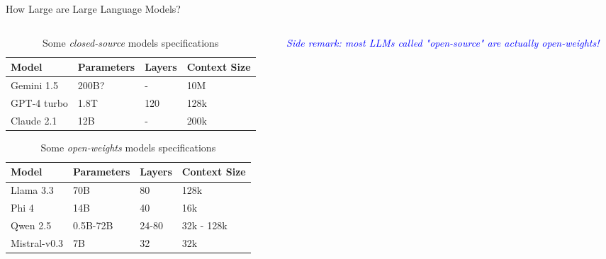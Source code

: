 \documentclass[11pt,aspectratio=169]{beamer}
\begin{document}
\begin{frame}{How Large are Large Language Models?}
    \begin{columns}
        \begin{column}{0.6\linewidth}
            \vspace{-0.1cm}
            \begin{table}[]
                \begin{tabular}{@{}llll@{}}
                    \toprule
                    Model       & Parameters & Layers & Context Size  \\ \midrule
                    Gemini 1.5  & 200B?      & -      & 10M  \\
                    GPT-4 turbo & 1.8T       & 120    & 128k            \\
                    Claude 2.1  & 12B        & -      & 200k            \\ \bottomrule
                \end{tabular}
                \caption{\centering Some \textsl{closed-source} models specifications}
            \end{table}
            \vspace{-0.4cm}
            \begin{table}[]
                \begin{tabular}{@{}llll@{}}
                \toprule
                Model        & Parameters & Layers & Context Size \\ \midrule
                Llama 3.3    & 70B        & 80     & 128k           \\
                Phi 4        & 14B        & 40     & 16k            \\
                Qwen 2.5     & 0.5B-72B   & 24-80  & 32k - 128k     \\
                Mistral-v0.3 & 7B         & 32     & 32k            \\ \bottomrule
                \end{tabular}
                \caption{\centering Some \textsl{open-weights} models specifications}
            \end{table}
        \end{column}
        \begin{column}{0.4\linewidth}
            \vspace*{-0.5cm}
            \begin{center}
            \textcolor{blue}{\sl Side remark: most LLMs called "open-source" are actually open-weights!}
            \end{center}

\end{column}
\end{columns}
\end{frame}
\end{document}
